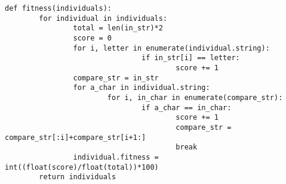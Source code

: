 \documentclass[conference]{IEEEtrans}
\begin{document}
\begin{minipage}{\textwidth}

\begin{lstlisting}[caption = {Fitness Function}, label = {lst:fit}]
def fitness(individuals):
        for individual in individuals:
                total = len(in_str)*2
                score = 0
                for i, letter in enumerate(individual.string):
                                if in_str[i] == letter:
                                        score += 1
                compare_str = in_str
                for a_char in individual.string:
                        for i, in_char in enumerate(compare_str):
                                if a_char == in_char:
                                        score += 1
                                        compare_str = compare_str[:i]+compare_str[i+1:]
                                        break
                individual.fitness = int((float(score)/float(total))*100)                          
        return individuals
\end{lstlisting}
\end{minipage}
\fi
\end{document}
